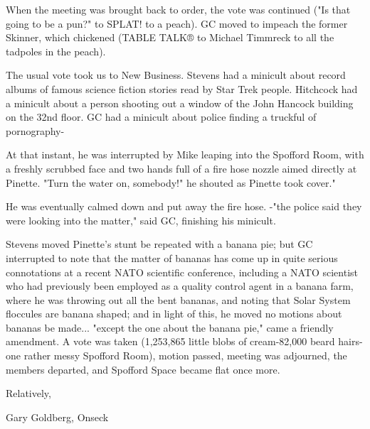 \documentclass[12pt]{article}
\begin{document}
When the meeting was brought back to order, the vote was continued ("Is that going to be a pun?" to SPLAT! to a peach). GC moved to impeach the former Skinner, which chickened (TABLE TALK® to Michael Timmreck to all the tadpoles in the peach).

The usual vote took us to New Business. Stevens had a minicult about record albums of famous science fiction stories read by Star Trek people. Hitchcock had a minicult about a person shooting out a window of the John Hancock building on the 32nd floor. GC had a minicult about police finding a truckful of pornography-

At that instant, he was interrupted by Mike leaping into the Spofford Room, with a freshly scrubbed face and two hands full of a fire hose nozzle aimed directly at Pinette. "Turn the water on, somebody!" he shouted as Pinette took cover."

He was eventually calmed down and put away the fire hose. -"the police said they were looking into the matter," said GC, finishing his minicult.

Stevens moved Pinette's stunt be repeated with a banana pie; but GC interrupted to note that the matter of bananas has come up in quite serious connotations at a recent NATO scientific conference, including a NATO scientist who had previously been employed as a quality control agent in a banana farm, where he was throwing out all the bent bananas, and noting that Solar System floccules are banana shaped; and in light of this, he moved no motions about bananas be made... "except the one about the banana pie," came a friendly amendment. A vote was taken (1,253,865 little blobs of cream-82,000 beard hairs-one rather messy Spofford Room), motion passed, meeting was adjourned, the members departed, and Spofford Space became flat once more.

\vspace{12pt}

\centerline{Relatively,}
\centerline{Gary Goldberg, Onseck}
\end{document}
